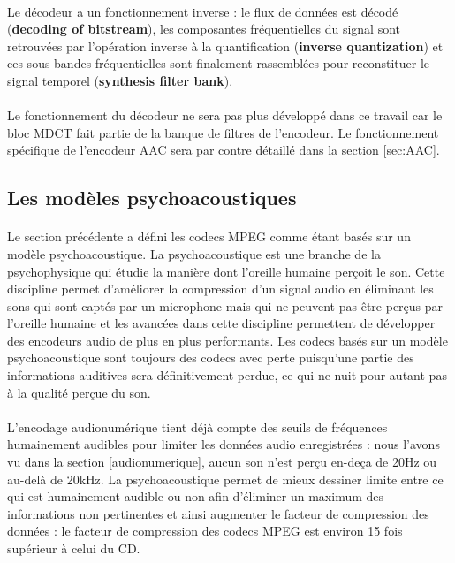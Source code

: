 \documentclass{article}
\begin{document}
    \paragraph{}
    Le décodeur a un fonctionnement inverse : le flux de données est décodé (\textbf{decoding of bitstream}), les composantes fréquentielles du signal sont retrouvées par l'opération inverse à la quantification (\textbf{inverse quantization}) et ces sous-bandes fréquentielles sont finalement rassemblées pour reconstituer le signal temporel (\textbf{synthesis filter bank}).

    \paragraph{}
    Le fonctionnement du décodeur ne sera pas plus développé dans ce travail car le bloc MDCT fait partie de la banque de filtres de l'encodeur. Le fonctionnement spécifique de l'encodeur AAC sera par contre détaillé dans la section \ref{sec:AAC}.


    \subsection{Les modèles psychoacoustiques}
    \paragraph{}
    Le section précédente a défini les codecs MPEG comme étant basés sur un modèle psychoacoustique. La psychoacoustique est une branche de la psychophysique qui étudie la manière dont l'oreille humaine perçoit le son\cite{wiki:psychoacoustic}. Cette discipline permet d'améliorer la compression d'un signal audio en éliminant les sons qui sont captés par un microphone mais qui ne peuvent pas être perçus par l'oreille humaine et les avancées dans cette discipline permettent de développer des encodeurs audio de plus en plus performants. Les codecs basés sur un modèle psychoacoustique sont toujours des codecs avec perte puisqu'une partie des informations auditives sera définitivement perdue, ce qui ne nuit pour autant pas à la qualité perçue du son.

    \paragraph{}
    L'encodage audionumérique tient déjà compte des seuils de fréquences humainement audibles pour limiter les données audio enregistrées : nous l'avons vu dans la section \ref{audionumerique}, aucun son n'est perçu en-deça de 20Hz ou au-delà de 20kHz. La psychoacoustique permet de mieux dessiner limite entre ce qui est humainement audible ou non afin d'éliminer un maximum des informations non pertinentes et ainsi augmenter le facteur de compression des données : le facteur de compression des codecs MPEG est environ 15 fois supérieur à celui du CD\cite{2019-Herre-Dick}.
\end{document}
